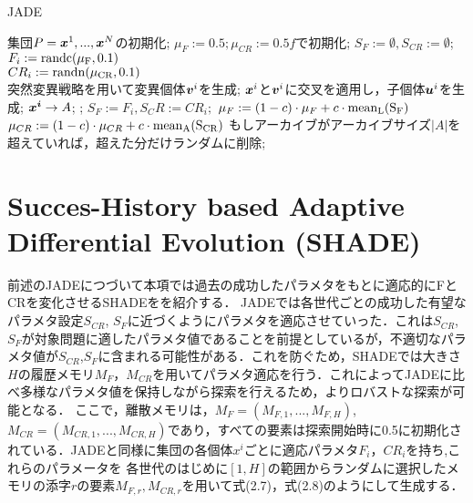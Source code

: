 \documentclass[a4paper,11pt,oneside,openany]{jsbook}
\def\vector#1{\mbox{\boldmath $#1$}}
\begin{document}
\newpage
\begin{algorithm}
\caption{JADE}
\label{alg:pbnf}
\begin{algorithmic}
\STATE 集団$P={\vector{x}^1,...,\vector{x}^N}$の初期化;
\STATE  $\mu_F := 0.5; \mu_{CR} := 0.5f$で初期化;
    \STATE $S_F := \emptyset, S_{CR} := \emptyset$;
        \STATE $F_i := \rm{randc}(\mu _F, 0.1)$ \\
        \STATE $CR_i := \rm{randn}(\mu _{CR}, 0.1)$ \\
        \STATE 突然変異戦略を用いて変異個体{$\vector{v}^i$}を生成;
        \STATE $\vector{x}^i$と$\vector{v}^i$に交叉を適用し，子個体$\vector{u}^i$を生成;
    \ENDFOR
        \IF {$f(\vector{u}^i) \leqq f(\vector{x}^i)$}
            \STATE $\vector{x^i} \rightarrow {A}$;
            \STATE {$\vector{x}^i:=\vector{u}^i$};
            \STATE $S_F := {F_i}, S_CR := {CR_i};$
        \ENDIF
    \ENDFOR
        \STATE $\mu_F := (1 - c)\cdot\mu _F + c\cdot \rm{mean}_L(S_F)$
        \STATE $\mu_{CR} := (1 - c)\cdot\mu _{CR} + c\cdot  \rm{mean}_A(S_{CR})$
    \ENDIF
    \STATE もしアーカイブがアーカイブサイズ$|A|$を超えていれば，超えた分だけランダムに削除;
\ENDWHILE
\end{algorithmic}
\end{algorithm}
\newpage

\section{Succes-History based Adaptive Differential Evolution (SHADE)}
前述のJADEにつづいて本項では過去の成功したパラメタをもとに適応的にFとCRを変化させるSHADEをを紹介する．
JADEでは各世代ごとの成功した有望なパラメタ設定$S_{CR}$, $S_{F}$に近づくようにパラメタを適応させていった．これは$S_{CR}$,$S_F$が対象問題に適したパラメタ値であることを前提としているが，不適切なパラメタ値が$S_{CR}$,$S_F$に含まれる可能性がある．これを防ぐため，SHADEでは大きさ$H$の履歴メモリ$M_F$，$M_{CR}$を用いてパラメタ適応を行う．これによってJADEに比べ多様なパラメタ値を保持しながら探索を行えるため，よりロバストな探索が可能となる．
ここで，離散メモリは，$M_F = (M_{F,1},...,M_{F,H})$,$M_{CR}= (M_{CR,1},...,M_{CR,H})$であり，すべての要素は探索開始時に0.5に初期化されている．JADEと同様に集団の各個体\vector{x^i}ごとに適応パラメタ$F_i$，$CR_i$を持ち,これらのパラメータを
各世代のはじめに$[1,H]$の範囲からランダムに選択したメモリの添字$r$の要素$M_{F,r},M_{CR,r}$を用いて式(2.7)，式(2.8)のようにして生成する．
\end{document}
